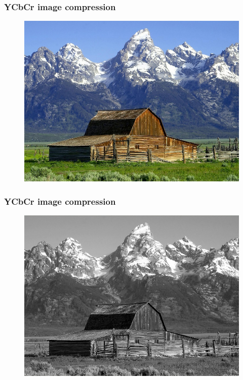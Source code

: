 \documentclass{beamer}
\begin{document}
\begin{frame}
\frametitle{YCbCr image compression}
    \begin{figure}[htb]
    \includegraphics[scale=0.3]{YCbCr-normal.jpg}
    \end{figure}
\end{frame}

\begin{frame}
\frametitle{YCbCr image compression}
    \begin{figure}[htb]
    \includegraphics[scale=0.3]{YCbCr-bw.jpg}
    \end{figure}
\end{frame}
\end{document}
